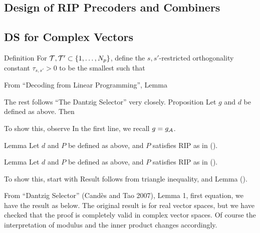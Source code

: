 \subsection{Design of RIP Precoders and Combiners}

\subsection{DS for Complex Vectors}

\Result
{Definition}
{
For \(\mathcal{T}, \mathcal{T}' \subset \{1, \dotsc, N_p\}\), define the \(s,s'\)-restricted orthogonality constant \(\tau_{s,s'} >0\) to be the smallest such that
%
}

From ``Decoding from Linear Programming'',
\Result
{Lemma}
{
%
}

The rest follows ``The Dantzig Selector'' very closely.
\Result
{Proposition}
{
Let \(g\) and \(d\) be defined as above.
Then
%
}

To show this, observe
%
%
In the first line, we recall \(g =g_{\mathcal{A}}\).

\Result
{Lemma}
{
Let \(d\) and \(P\) be defined as above, and \(P\) satisfies RIP as in ().
%
%
}

\Result
{Lemma}
{
Let \(d\) and \(P\) be defined as above, and \(P\) satisfies RIP as in ().
%
%
}

To show this, start with
%
%
Result follows from triangle inequality, and Lemma ().

From ``Dantzig Selector'' (Cand\`es and Tao 2007), Lemma 1, first equation, we have the result as below.
The original result is for real vector spaces, but we have checked that the proof is completely valid in complex vector spaces.
Of course the interpretation of modulus and the inner product changes accordingly.

